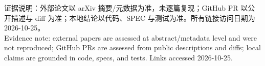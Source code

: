 \documentclass[UTF8,11pt]{ctexart}
\begin{document}
\noindent\footnotesize
证据说明：外部论文以 arXiv 摘要/元数据为准，未逐篇复现；GitHub PR 以公开描述与 diff 为准；本地结论以代码、SPEC 与测试为准。所有链接访问日期为 2026-10-25。\\
Evidence note: external papers are assessed at abstract/metadata level and were not reproduced; GitHub PRs are assessed from public descriptions and diffs; local claims are grounded in code, specs, and tests. Links accessed 2026-10-25.
\end{document}
